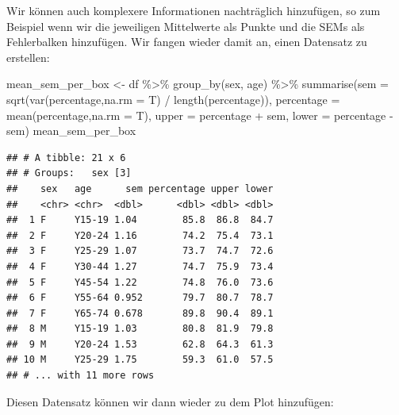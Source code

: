 \documentclass[
]{book}
\newenvironment{Shaded}{\begin{snugshade}}{\end{snugshade}}
\newcommand{\AttributeTok}[1]{\textcolor[rgb]{0.77,0.63,0.00}{#1}}
\newcommand{\FunctionTok}[1]{\textcolor[rgb]{0.00,0.00,0.00}{#1}}
\newcommand{\NormalTok}[1]{#1}
\newcommand{\OtherTok}[1]{\textcolor[rgb]{0.56,0.35,0.01}{#1}}
\newcommand{\SpecialCharTok}[1]{\textcolor[rgb]{0.00,0.00,0.00}{#1}}
\begin{document}
Wir können auch komplexere Informationen nachträglich hinzufügen, so zum Beispiel wenn wir die jeweiligen Mittelwerte als Punkte und die SEMs als Fehlerbalken hinzufügen. Wir fangen wieder damit an, einen Datensatz zu erstellen:

\begin{Shaded}
\begin{Highlighting}[]
\NormalTok{mean\_sem\_per\_box }\OtherTok{\textless{}{-}}\NormalTok{ df }\SpecialCharTok{\%\textgreater{}\%} 
  \FunctionTok{group\_by}\NormalTok{(sex, age) }\SpecialCharTok{\%\textgreater{}\%} 
  \FunctionTok{summarise}\NormalTok{(}\AttributeTok{sem =} \FunctionTok{sqrt}\NormalTok{(}\FunctionTok{var}\NormalTok{(percentage,}\AttributeTok{na.rm =}\NormalTok{ T) }\SpecialCharTok{/} \FunctionTok{length}\NormalTok{(percentage)),}
            \AttributeTok{percentage =} \FunctionTok{mean}\NormalTok{(percentage,}\AttributeTok{na.rm =}\NormalTok{ T),}
            \AttributeTok{upper =}\NormalTok{ percentage }\SpecialCharTok{+}\NormalTok{ sem,}
            \AttributeTok{lower =}\NormalTok{ percentage }\SpecialCharTok{{-}}\NormalTok{ sem)}
\NormalTok{mean\_sem\_per\_box}
\end{Highlighting}
\end{Shaded}

\begin{verbatim}
## # A tibble: 21 x 6
## # Groups:   sex [3]
##    sex   age      sem percentage upper lower
##    <chr> <chr>  <dbl>      <dbl> <dbl> <dbl>
##  1 F     Y15-19 1.04        85.8  86.8  84.7
##  2 F     Y20-24 1.16        74.2  75.4  73.1
##  3 F     Y25-29 1.07        73.7  74.7  72.6
##  4 F     Y30-44 1.27        74.7  75.9  73.4
##  5 F     Y45-54 1.22        74.8  76.0  73.6
##  6 F     Y55-64 0.952       79.7  80.7  78.7
##  7 F     Y65-74 0.678       89.8  90.4  89.1
##  8 M     Y15-19 1.03        80.8  81.9  79.8
##  9 M     Y20-24 1.53        62.8  64.3  61.3
## 10 M     Y25-29 1.75        59.3  61.0  57.5
## # ... with 11 more rows
\end{verbatim}

Diesen Datensatz können wir dann wieder zu dem Plot hinzufügen:
\end{document}

